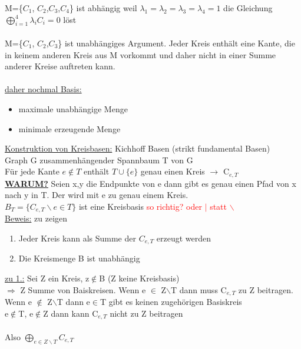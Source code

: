 M=\{$C_1$, $C_2$,$C_3$,$C_4$\} ist abhängig weil $\lambda_1=\lambda_2=\lambda_3=\lambda_4=1$ die Gleichung\\
$\bigoplus\limits_{i=1}^{4} \lambda_i C_i=0$ löst
\\\\
M=\{$C_1$, $C_2$,$C_3$\} ist unabhängiges Argument. Jeder Kreis enthält eine Kante, die in keinem anderen Kreis aus M vorkommt und daher nicht in einer Summe anderer Kreise auftreten kann.
\\\\
\underline{daher nochmal Basis:}
\begin{itemize}
	\item maximale unabhängige Menge
	\item minimale erzeugende Menge
\end{itemize}

\underline{Konstruktion von Kreisbasen:} Kichhoff Basen (strikt fundamental Basen)
\\
Graph G zusammenhängender Spannbaum T von G\\
Für jede Kante $e\notin T$ enthält $T \cup \{e\}$ genau einen Kreis $\rightarrow$ C$_{e,T}$\\
\underline{\textbf{WARUM?}} Seien x,y die Endpunkte von e dann gibt es genau einen Pfad von x nach y in T. Der wird mit e zu genau einem Kreis.
\\
$B_T=\{C_{e,T}\backslash e \in T\}$ ist eine Kreisbasis \textcolor{red}{so richtig? oder $|$ statt $\backslash$}
\\
\underline{Beweis:} zu zeigen
\begin{enumerate}
	\item Jeder Kreis kann als Summe der $C_{e,T}$ erzeugt werden
	\item Die Kreismenge B ist unabhängig
\end{enumerate}

\underline{zu 1.:} Sei Z ein Kreis, z$\notin$B (Z keine Kreisbasis)\\
$\Rightarrow$ Z Summe von Baiskreisen. Wenn e $\in$ Z$\backslash$T dann muss C$_{e,T}$ zu Z beitragen. Wenn e $\notin$ Z$\backslash$T dann e$\in$T gibt es keinen zugehörigen Basiskreis\\
e$\notin$T, e$\notin$Z dann kann C$_{e,T}$ nicht zu Z beitragen\\\\
Also $\bigoplus\limits_{e \in Z\backslash T} C_{e,T}$

